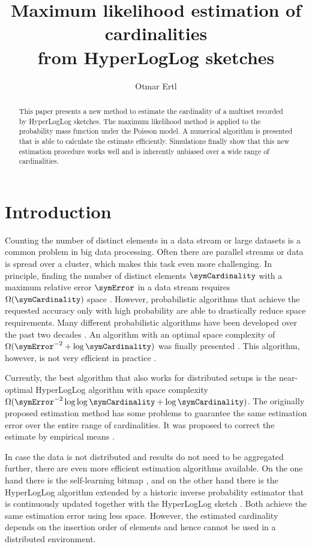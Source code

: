 \documentclass[11pt]{article} %
\title{Maximum likelihood estimation of cardinalities\\ from HyperLogLog sketches}
\author{Otmar Ertl}
\begin{document}
\maketitle
\begin{abstract}
This paper presents a new method to estimate the cardinality of a multiset recorded by HyperLogLog sketches. The maximum likelihood method is applied to the probability mass function under the Poisson model. A numerical algorithm is presented that is able to calculate the estimate efficiently. Simulations finally show that this new estimation procedure works well and is inherently unbiased over a wide range of cardinalities.
\end{abstract}

\section{Introduction}
Counting the number of distinct elements in a data stream or large datasets is a common problem in big data processing. Often there are parallel streams  or data is spread over a cluster, which makes this task even more challenging.
In principle, finding the number of distinct elements $\symCardinality$ with a maximum relative error $\symError$  in a data stream requires $\Omega(\symCardinality)$ space \cite{Alon1999}. However, probabilistic algorithms that achieve the requested accuracy only with high probability are able to drastically reduce space requirements. Many different probabilistic algorithms have been developed over the past two decades \cite{Metwally2008,Ting2014}. An algorithm with an optimal space complexity of $\Omega(\symError^{-2}+\log \symCardinality)$ \cite{Alon1999, Indyk2003} was finally presented \cite{Kane2010}. This algorithm, however, is not very efficient in practice \cite{Ting2014}.

Currently, the best algorithm that also works for distributed setups is the near-optimal HyperLogLog algorithm \cite{Flajolet2007} with space complexity $\Omega(\symError^{-2} \log\log\symCardinality +\log \symCardinality)$. The originally proposed estimation method has some problems to guarantee the same estimation error over the entire range of cardinalities. It was proposed to correct the estimate by empirical means \cite{Heule2013,Rhodes2015,Sanfilippo2014}. 

In case the data is not distributed and results do not need to be aggregated further, there are even more efficient estimation algorithms available. On the one hand there is the self-learning bitmap \cite{Chen2011, Chen2015}, and on the other hand there is the HyperLogLog algorithm extended by a historic inverse probability estimator that is continuously updated together with the HyperLogLog sketch \cite{Ting2014}. Both achieve the same estimation error using less space. However, the estimated cardinality depends on the insertion order of elements and hence cannot be used in a distributed environment. 
\end{document}
